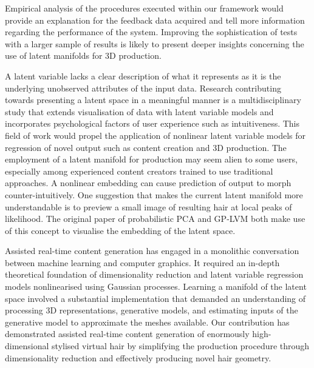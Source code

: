\documentclass[ %
author={Dillon Keith Diep},
supervisor={Dr. Carl Henrik Ek},
degree={MEng},
title={ART-CG Hair:},
subtitle={Assisted Real-time Content Generation of Stylised Virtual Hair},
type={Research},
year={2017} ]{dissertation}
\begin{document}
	Empirical analysis of the procedures executed within our framework would provide an explanation for the feedback data acquired and tell more information regarding the performance of the system. Improving the sophistication of tests with a larger sample of results is likely to present deeper insights concerning the use of latent manifolds for 3D production.
	
	A latent variable lacks a clear description of what it represents as it is the underlying unobserved attributes of the input data. Research contributing towards presenting a latent space in a meaningful manner is a multidisciplinary study that extends visualisation of data with latent variable models and incorporates psychological factors of user experience such as intuitiveness. This field of work would propel the application of nonlinear latent variable models for regression of novel output such as content creation and 3D production.
	The employment of a latent manifold for production may seem alien to some users, especially among experienced content creators trained to use traditional approaches. A nonlinear embedding can cause prediction of output to morph counter-intuitively. One suggestion that makes the current latent manifold more understandable is to preview a small image of resulting hair at local peaks of likelihood. The original paper of probabilistic PCA and GP-LVM both make use of this concept to visualise the embedding of the latent space.
	
	Assisted real-time content generation has engaged in a monolithic conversation between machine learning and computer graphics. It required an in-depth theoretical foundation of dimensionality reduction and latent variable regression models nonlinearised using Gaussian processes. 
	Learning a manifold of the latent space involved a substantial implementation that demanded an understanding of processing 3D representations, generative models, and estimating inputs of the generative model to approximate the meshes available.
	Our contribution has demonstrated assisted real-time content generation of enormously high-dimensional stylised virtual hair by simplifying the production procedure through dimensionality reduction and effectively producing novel hair geometry.
	
	
	
	
\end{document}
